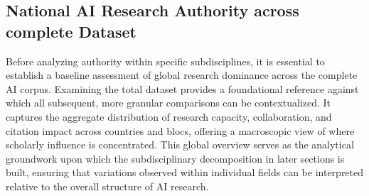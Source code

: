 \documentclass{article}
\begin{document}



\subsection{National AI Research Authority across complete Dataset}

Before analyzing authority within specific subdisciplines, it is essential to establish a baseline assessment of global research dominance across the complete AI corpus. Examining the total dataset provides a foundational reference against which all subsequent, more granular comparisons can be contextualized. It captures the aggregate distribution of research capacity, collaboration, and citation impact across countries and blocs, offering a macroscopic view of where scholarly influence is concentrated. This global overview serves as the analytical groundwork upon which the subdisciplinary decomposition in later sections is built, ensuring that variations observed within individual fields can be interpreted relative to the overall structure of AI research.
\end{document}

